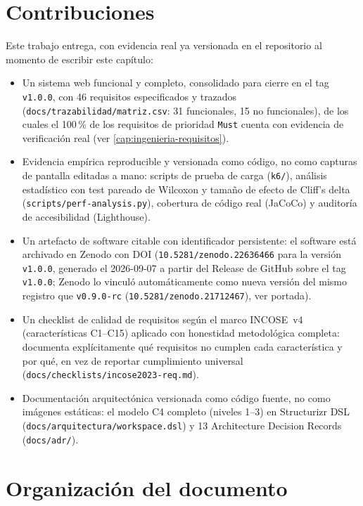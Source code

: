 \section{Contribuciones}

Este trabajo entrega, con evidencia real ya versionada en el
repositorio al momento de escribir este capítulo:

\begin{itemize}[leftmargin=1.2cm]
  \item Un sistema web funcional y completo, consolidado para cierre en el tag \texttt{v1.0.0}, con
    46 requisitos especificados y trazados
    (\texttt{docs/trazabilidad/matriz.csv}: 31 funcionales, 15 no
    funcionales), de los cuales el 100\,\% de los requisitos de
    prioridad \texttt{Must} cuenta con evidencia de verificación real
    (ver \autoref{cap:ingenieria-requisitos}).
  \item Evidencia empírica reproducible y versionada como código, no
    como capturas de pantalla editadas a mano: scripts de prueba de
    carga (\texttt{k6/}), análisis estadístico con test pareado de
    Wilcoxon y tamaño de efecto de Cliff's delta
    (\texttt{scripts/perf-analysis.py}), cobertura de código real
    (JaCoCo) y auditoría de accesibilidad (Lighthouse).
  \item Un artefacto de software citable con identificador persistente:
    el software está archivado en Zenodo con DOI
    (\texttt{10.5281/zenodo.22636466} para la versión \texttt{v1.0.0},
    generado el 2026-09-07 a partir del Release de GitHub sobre el tag
    \texttt{v1.0.0}; Zenodo lo vinculó automáticamente como nueva
    versión del mismo registro que \texttt{v0.9.0-rc}
    (\texttt{10.5281/zenodo.21712467}), ver portada).
  \item Un checklist de calidad de requisitos según el marco INCOSE~v4
    (características C1--C15) aplicado con honestidad metodológica
    completa: documenta explícitamente qué requisitos no cumplen cada
    característica y por qué, en vez de reportar cumplimiento universal
    (\texttt{docs/checklists/incose2023-req.md}).
  \item Documentación arquitectónica versionada como código fuente, no
    como imágenes estáticas: el modelo C4 completo (niveles 1--3) en
    Structurizr DSL (\texttt{docs/arquitectura/workspace.dsl}) y 13
    Architecture Decision Records (\texttt{docs/adr/}).
\end{itemize}

\section{Organización del documento}

